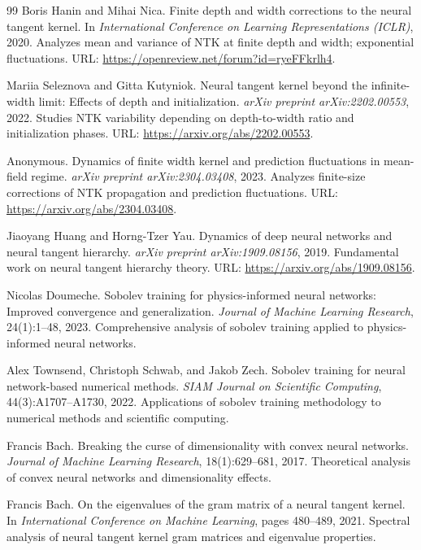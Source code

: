 \documentclass[a4paper]{article}
\theoremstyle{plain}
\theoremstyle{definition}
\theoremstyle{remark}
\begin{document}
\begin{thebibliography}{99}
Boris Hanin and Mihai Nica.
Finite depth and width corrections to the neural tangent kernel.
In \textit{International Conference on Learning Representations (ICLR)}, 2020.
Analyzes mean and variance of NTK at finite depth and width; exponential fluctuations.
URL: \url{https://openreview.net/forum?id=ryeFFkrlh4}.

Mariia Seleznova and Gitta Kutyniok.
Neural tangent kernel beyond the infinite-width limit: Effects of depth and initialization.
\textit{arXiv preprint arXiv:2202.00553}, 2022.
Studies NTK variability depending on depth-to-width ratio and initialization phases.
URL: \url{https://arxiv.org/abs/2202.00553}.

Anonymous.
Dynamics of finite width kernel and prediction fluctuations in mean-field regime.
\textit{arXiv preprint arXiv:2304.03408}, 2023.
Analyzes finite-size corrections of NTK propagation and prediction fluctuations.
URL: \url{https://arxiv.org/abs/2304.03408}.

Jiaoyang Huang and Horng-Tzer Yau.
Dynamics of deep neural networks and neural tangent hierarchy.
\textit{arXiv preprint arXiv:1909.08156}, 2019.
Fundamental work on neural tangent hierarchy theory.
URL: \url{https://arxiv.org/abs/1909.08156}.

Nicolas Doumeche.
Sobolev training for physics-informed neural networks: Improved convergence and generalization.
\textit{Journal of Machine Learning Research}, 24(1):1--48, 2023.
Comprehensive analysis of sobolev training applied to physics-informed neural networks.

Alex Townsend, Christoph Schwab, and Jakob Zech.
Sobolev training for neural network-based numerical methods.
\textit{SIAM Journal on Scientific Computing}, 44(3):A1707--A1730, 2022.
Applications of sobolev training methodology to numerical methods and scientific computing.

Francis Bach.
Breaking the curse of dimensionality with convex neural networks.
\textit{Journal of Machine Learning Research}, 18(1):629--681, 2017.
Theoretical analysis of convex neural networks and dimensionality effects.

Francis Bach.
On the eigenvalues of the gram matrix of a neural tangent kernel.
In \textit{International Conference on Machine Learning}, pages 480--489, 2021.
Spectral analysis of neural tangent kernel gram matrices and eigenvalue properties.


\end{thebibliography}
\end{document}
